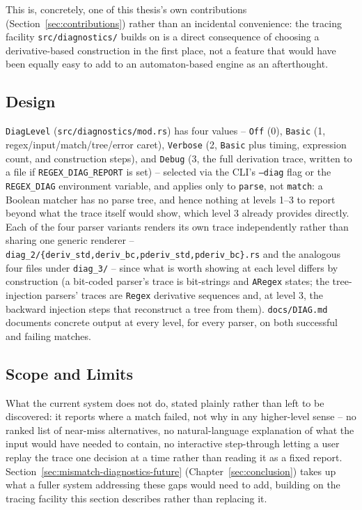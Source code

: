 This is, concretely, one of this thesis's own contributions
(Section~\ref{sec:contributions}) rather than an incidental convenience:
the tracing facility \texttt{src/diagnostics/} builds on is a direct
consequence of choosing a derivative-based construction in the first
place, not a feature that would have been equally easy to add to an
automaton-based engine as an afterthought.

\subsection{Design}
\label{sec:diagnostics-design}

\texttt{DiagLevel} (\texttt{src/diagnostics/mod.rs}) has four values --
\texttt{Off} (0), \texttt{Basic} (1, regex/input/match/tree/error caret),
\texttt{Verbose} (2, \texttt{Basic} plus timing, expression count, and
construction steps), and \texttt{Debug} (3, the full derivation trace,
written to a file if \texttt{REGEX\_DIAG\_REPORT} is set) -- selected via
the CLI's \texttt{--diag} flag or the \texttt{REGEX\_DIAG} environment
variable, and applies only to \texttt{parse}, not \texttt{match}: a
Boolean matcher has no parse tree, and hence nothing at levels 1--3 to
report beyond what the trace itself would show, which level 3 already
provides directly. Each of the four parser variants renders its own
trace independently rather than sharing one generic renderer --
\texttt{diag\_2/\{deriv\_std,deriv\_bc,pderiv\_std,pderiv\_bc\}.rs} and
the analogous four files under \texttt{diag\_3/} -- since what is worth
showing at each level differs by construction (a bit-coded parser's trace
is bit-strings and \texttt{ARegex} states; the tree-injection parsers'
traces are \texttt{Regex} derivative sequences and, at level 3, the
backward injection steps that reconstruct a tree from them).
\texttt{docs/DIAG.md} documents concrete output at every level, for every
parser, on both successful and failing matches.

\subsection{Scope and Limits}
\label{sec:diagnostics-scope-limits}

What the current system does not do, stated plainly rather than left to
be discovered: it reports where a match failed, not why in any
higher-level sense -- no ranked list of near-miss alternatives, no
natural-language explanation of what the input would have needed to
contain, no interactive step-through letting a user replay the trace one
decision at a time rather than reading it as a fixed report.
Section~\ref{sec:mismatch-diagnostics-future} (Chapter~\ref{sec:conclusion})
takes up what a fuller system addressing these gaps would need to add,
building on the tracing facility this section describes rather than
replacing it.



